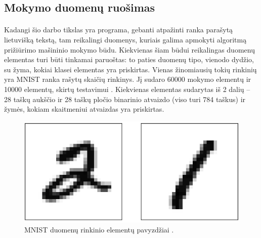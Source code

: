 \documentclass[a4paper,12pt]{article}
\begin{document}
\subsection{Mokymo duomenų ruošimas}

\paragraph{} Kadangi šio darbo tikslas yra programa, gebanti atpažinti ranka parašytą lietuvišką tekstą, tam reikalingi duomenys, kuriais galima apmokyti algoritmą prižiūrimo mašininio mokymo būdu. Kiekvienas šiam būdui reikalingas duomenų elementas turi būti tinkamai paruoštas: to paties duomenų tipo, vienodo dydžio, su žyma, kokiai klasei elementas yra priskirtas. Vienas žinomiausių tokių rinkinių yra MNIST ranka rašytų skaičių rinkinys. Jį sudaro 60000 mokymo elementų ir 10000 elementų, skirtų testavimui \cite{MNIST}. Kiekvienas elementas sudarytas iš 2 dalių – 28 taškų aukščio ir 28  taškų pločio binarinio atvaizdo (viso turi 784 taškus) ir žymės, kokiam skaitmeniui atvaizdas yra priskirtas.
		\begin{figure}[H]
			\centering
			\includegraphics[scale=0.2]{images/mnist}
			\caption{MNIST duomenų rinkinio elementų pavyzdžiai \cite{MNISTNUMBERS}.}   %
			\label{img:mnist}
		\end{figure}
\end{document}
